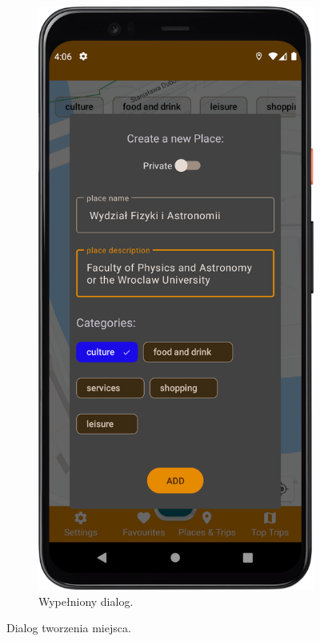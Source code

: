\begin{figure}[H]
\begin{subfigure}[b]{0.3\textwidth}
            \end{subfigure}
            \hfill
            \begin{subfigure}[b]{0.3\textwidth}
                \centering
                \includegraphics[width=\textwidth]{src/app/add_place2.png}
                \caption{Wypełniony dialog.\label{place_filled}}
            \end{subfigure}
            \caption{Dialog tworzenia miejsca.\label{add_place}}
            \qquad
        \end{figure} 
        \vspace{1cm}

